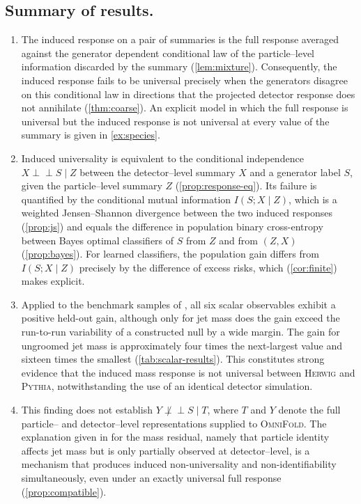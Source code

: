 \documentclass[12pt]{article}
\newcommand{\indep}{\perp\!\!\!\perp}
\newcommand{\1}{\mathbbm{1}}
\renewcommand{\[}{\begin{equation}}
\renewcommand{\]}{\end{equation}}
\begin{document}
    \subsection{Summary of results.}
    \begin{enumerate}
        \item The induced response on a pair of summaries is the full response averaged against the generator dependent conditional law of the particle--level information discarded by the summary (\cref{lem:mixture}).
        Consequently, the induced response fails to be universal precisely when the generators disagree on this conditional law in directions that the projected detector response does not annihilate (\cref{thm:coarse}).
        An explicit model in which the full response is universal but the induced response is not universal at every value of the summary is given in \cref{ex:species}.

        \item Induced universality is equivalent to the conditional independence \(X\indep S\mid Z\) between the detector--level summary \(X\) and a generator label \(S\), given the particle--level summary \(Z\) (\cref{prop:response-eq}).
        Its failure is quantified by the conditional mutual information \(I(S;X\mid Z)\), which is a weighted Jensen--Shannon divergence between the two induced responses (\cref{prop:js}) and equals the difference in population binary cross-entropy between Bayes optimal classifiers of \(S\) from \(Z\) and from \((Z,X)\) (\cref{prop:bayes}).
        For learned classifiers, the population gain differs from \(I(S;X\mid Z)\) precisely by the difference of excess risks, which (\cref{cor:finite}) makes explicit.

        \item Applied to the benchmark samples of \textcite{andreassen_2019_3548091}, all six scalar observables exhibit a positive held-out gain, although only for jet mass does the gain exceed the run-to-run variability of a constructed null by a wide margin.
        The gain for ungroomed jet mass is approximately four times the next-largest value and sixteen times the smallest (\cref{tab:scalar-results}).
        This constitutes strong evidence that the induced mass response is not universal between \textsc{Herwig} and \textsc{Pythia}, notwithstanding the use of an identical detector simulation.

        \item This finding does not establish \(Y\not\indep S\mid T\), where \(T\) and \(Y\) denote the full particle-- and detector--level representations supplied to \textsc{OmniFold}.
        The explanation given in \textcite{Andreassen:2019cjw} for the mass residual, namely that particle identity affects jet mass but is only partially observed at detector--level, is a mechanism that produces induced non-universality and non-identifiability simultaneously, even under an exactly universal full response (\cref{prop:compatible}).
        

\end{enumerate}
\end{document}
